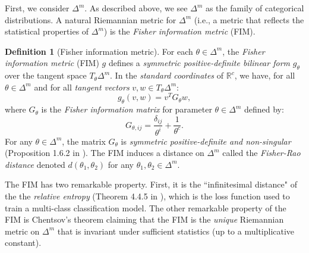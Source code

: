 \documentclass[entropy,article,submit,pdftex,moreauthors]{Definitions/mdpi}
\newcommand{\R}{\ensuremath{\mathbb{R}}}
\theoremstyle{plain}
\theoremstyle{definition}
\newtheorem{definition}[theorem]{Definition}
\begin{document}
First, we consider $\Delta^m$. As described above, we see $\Delta^m$ as the family of categorical distributions. A natural Riemannian metric for $\Delta^m$ (i.e., a metric that reflects the statistical properties of $\Delta^m$) is the \emph{Fisher information metric} (FIM).
\begin{definition}[Fisher information metric]
    \label{def:fim}
    For each $\theta \in \Delta^m$, the \emph{Fisher information metric} (FIM) $g$ defines a \emph{symmetric positive-definite bilinear form} $g_\theta$ over the tangent space $T_\theta\Delta^m$. In the \emph{standard coordinates} of $\R^c$, we have, for all $\theta \in \Delta^m$ and for all \emph{tangent vectors} $v,w \in T_\theta \Delta^m$:
    \begin{equation*}
        g_\theta(v, w) = v^T G_\theta w,
    \end{equation*}
    where $G_\theta$ is the \emph{Fisher information matrix} for parameter $\theta \in \Delta^m$ defined by:
    \begin{equation}
        G_{\theta, ij} = \frac{\delta_{ij}}{\theta^i} + \frac{1}{\theta^c}.
    \end{equation}
    For any $\theta \in \Delta^m$, the matrix $G_\theta$ is \emph{symmetric positive-definite and non-singular} (Proposition 1.6.2 in \citep{calinGeometricModelingProbability2014}). The FIM induces a distance on $\Delta^m$ called the \emph{Fisher-Rao distance} denoted $d(\theta_1, \theta_2)$ for any $\theta_1, \theta_2 \in \Delta^m$.
\end{definition}
The FIM has two remarkable property. First, it is the ``infinitesimal distance" of the the \emph{relative entropy} (Theorem 4.4.5 in \citep{calinGeometricModelingProbability2014}), which is the loss function used to train a multi-class classification model. The other remarkable property of the FIM is Chentsov's theorem \citep{cencovAlgebraicFoundationMathematical1978} claiming that the FIM is the \emph{unique} Riemannian metric on $\Delta^m$ that is invariant under sufficient statistics (up to a multiplicative constant).
\end{document}
